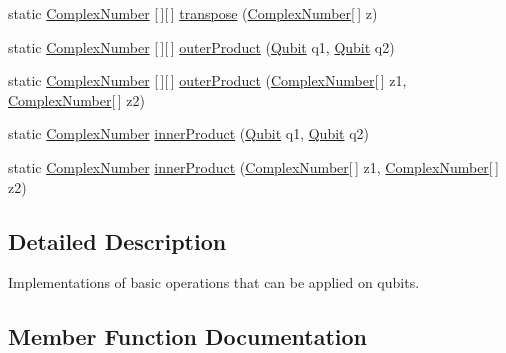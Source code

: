\begin{DoxyCompactItemize}
\item 
static \hyperlink{classcom_1_1ars_1_1complexnumbers_1_1_complex_number}{Complex\+Number} \mbox{[}$\,$\mbox{]}\mbox{[}$\,$\mbox{]} \hyperlink{classcom_1_1ars_1_1quantum_1_1utils_1_1_quantum_operations_af44db7c95ae6bda08cb865e46bf19eff}{transpose} (\hyperlink{classcom_1_1ars_1_1complexnumbers_1_1_complex_number}{Complex\+Number}\mbox{[}$\,$\mbox{]} z)
\item 
static \hyperlink{classcom_1_1ars_1_1complexnumbers_1_1_complex_number}{Complex\+Number} \mbox{[}$\,$\mbox{]}\mbox{[}$\,$\mbox{]} \hyperlink{classcom_1_1ars_1_1quantum_1_1utils_1_1_quantum_operations_a52a3eb03179e67e2a786cd724ff135bf}{outer\+Product} (\hyperlink{classcom_1_1ars_1_1qubits_1_1_qubit}{Qubit} q1, \hyperlink{classcom_1_1ars_1_1qubits_1_1_qubit}{Qubit} q2)
\item 
static \hyperlink{classcom_1_1ars_1_1complexnumbers_1_1_complex_number}{Complex\+Number} \mbox{[}$\,$\mbox{]}\mbox{[}$\,$\mbox{]} \hyperlink{classcom_1_1ars_1_1quantum_1_1utils_1_1_quantum_operations_a6d799274602f9c86fe28930b67ff5853}{outer\+Product} (\hyperlink{classcom_1_1ars_1_1complexnumbers_1_1_complex_number}{Complex\+Number}\mbox{[}$\,$\mbox{]} z1, \hyperlink{classcom_1_1ars_1_1complexnumbers_1_1_complex_number}{Complex\+Number}\mbox{[}$\,$\mbox{]} z2)
\item 
static \hyperlink{classcom_1_1ars_1_1complexnumbers_1_1_complex_number}{Complex\+Number} \hyperlink{classcom_1_1ars_1_1quantum_1_1utils_1_1_quantum_operations_a2343b850a5ad63b03644cdbd276d3bae}{inner\+Product} (\hyperlink{classcom_1_1ars_1_1qubits_1_1_qubit}{Qubit} q1, \hyperlink{classcom_1_1ars_1_1qubits_1_1_qubit}{Qubit} q2)
\item 
static \hyperlink{classcom_1_1ars_1_1complexnumbers_1_1_complex_number}{Complex\+Number} \hyperlink{classcom_1_1ars_1_1quantum_1_1utils_1_1_quantum_operations_a2f1819a882498d91bec8d26658a7e080}{inner\+Product} (\hyperlink{classcom_1_1ars_1_1complexnumbers_1_1_complex_number}{Complex\+Number}\mbox{[}$\,$\mbox{]} z1, \hyperlink{classcom_1_1ars_1_1complexnumbers_1_1_complex_number}{Complex\+Number}\mbox{[}$\,$\mbox{]} z2)
\end{DoxyCompactItemize}


\subsection{Detailed Description}
Implementations of basic operations that can be applied on qubits. 

\subsection{Member Function Documentation}
\hypertarget{classcom_1_1ars_1_1quantum_1_1utils_1_1_quantum_operations_a3d1e394a18ae308ebaec070e49ae8f8d}{}\label{classcom_1_1ars_1_1quantum_1_1utils_1_1_quantum_operations_a3d1e394a18ae308ebaec070e49ae8f8d} 

